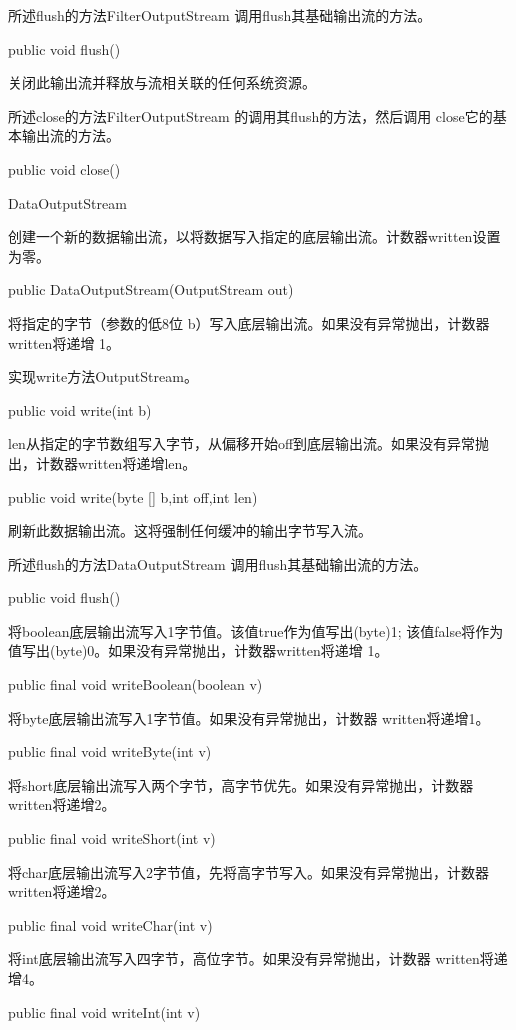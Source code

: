 所述flush的方法FilterOutputStream 调用flush其基础输出流的方法。
\begin{java}
public void flush()
\end{java}
关闭此输出流并释放与流相关联的任何系统资源。

所述close的方法FilterOutputStream 的调用其flush的方法，然后调用 close它的基本输出流的方法。
\begin{java}
public void close()
\end{java}

DataOutputStream

创建一个新的数据输出流，以将数据写入指定的底层输出流。计数器written设置为零。

\begin{java}
public DataOutputStream(OutputStream  out)
\end{java}
将指定的字节（参数的低8位 b）写入底层输出流。如果没有异常抛出，计数器written将递增 1。

实现write方法OutputStream。
\begin{java}
public void write(int b)
\end{java}
len从指定的字节数组写入字节，从偏移开始off到底层输出流。如果没有异常抛出，计数器written将递增len。
\begin{java}
public void write(byte [] b,int off,int len)
\end{java}
刷新此数据输出流。这将强制任何缓冲的输出字节写入流。

所述flush的方法DataOutputStream 调用flush其基础输出流的方法。
\begin{java}
public void flush()
\end{java}

将boolean底层输出流写入1字节值。该值true作为值写出(byte)1; 该值false将作为值写出(byte)0。如果没有异常抛出，计数器written将递增 1。
\begin{java}
public final void writeBoolean(boolean v)
\end{java}
将byte底层输出流写入1字节值。如果没有异常抛出，计数器 written将递增1。
\begin{java}
public final void writeByte(int v)
\end{java}

将short底层输出流写入两个字节，高字节优先。如果没有异常抛出，计数器 written将递增2。
\begin{java}
public final void writeShort(int v)
\end{java}
将char底层输出流写入2字节值，先将高字节写入。如果没有异常抛出，计数器written将递增2。
\begin{java}
public final void writeChar(int v)
\end{java}
将int底层输出流写入四字节，高位字节。如果没有异常抛出，计数器 written将递增4。
\begin{java}
public final void writeInt(int v)
\end{java}

